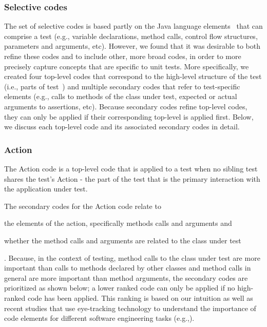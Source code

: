 \subsubsection{Selective codes}

The set of selective codes is based partly on the Java language elements~\cite{chapter8class} that can comprise a test (e.g., variable declarations, method calls, control flow structures, parameters and arguments, etc).
%
However, we found that it was desirable to both refine these codes and to include other, more broad codes, in order to more precisely capture concepts that are specific to unit tests.
%
More specifically, we created four top-level codes that correspond to the high-level structure of the test (i.e., parts of test~\cite{zhang2016towards}) and multiple secondary codes that refer to test-specific elements (e.g., calls to methods of the class under test, expected or actual arguments to assertions, etc).
%
Because secondary codes refine top-level codes, they can only be applied if their corresponding top-level is applied first. Below, we discuss each top-level code and its associated secondary codes in detail.

\subsubsection{Action}

The Action code is a top-level code that is applied to a test when no sibling test shares the test’s Action - the part of the test that is the primary interaction with the application under test.

The secondary codes for the Action code relate to 
\begin{enumerate*}[label=(\roman*)]
    \item the elements of the action, specifically methods calls and arguments and
    \item whether the method calls and arguments are related to the class under test
\end{enumerate*}.
%
Because, in the context of testing, method calls to the class under test are more important than calls to methods declared by other classes and method calls in general are more important than method arguments, the secondary codes are prioritized as shown below; a lower ranked code can only be applied if no high-ranked code has been applied.
%
This ranking is based on our intuition as well as recent studies that use eye-tracking technology to understand the importance of code elements for different software engineering tasks (e.g.,\cite{rodeghero2015empirical,rodeghero2015eye,begel2018eye}).

